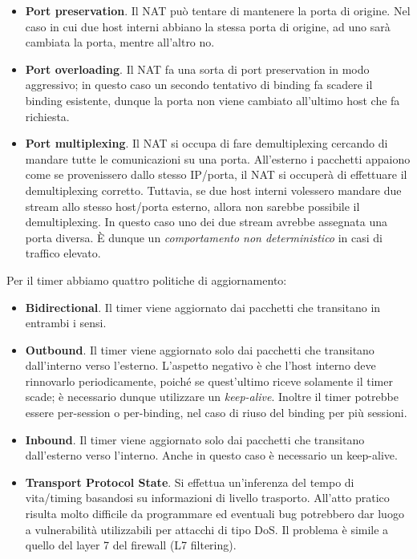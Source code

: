 \begin{itemize}
	\item \textbf{Port preservation}. Il NAT può tentare di mantenere la porta di origine. Nel caso in cui due host interni abbiano la stessa porta di origine, ad uno sarà cambiata la porta, mentre all'altro no.
	
	\item \textbf{Port overloading}. Il NAT fa una sorta di port preservation in modo aggressivo; in questo caso un secondo tentativo di binding fa scadere il binding esistente, dunque la porta non viene cambiato all'ultimo host che fa richiesta.
	
	\item \textbf{Port multiplexing}. Il NAT si occupa di fare demultiplexing cercando di mandare tutte le comunicazioni su una porta. All'esterno i pacchetti appaiono come se provenissero dallo stesso IP/porta, il NAT si occuperà di effettuare il demultiplexing corretto. Tuttavia, se due host interni volessero mandare due stream allo stesso host/porta esterno, allora non sarebbe possibile il demultiplexing. In questo caso uno dei due stream avrebbe assegnata una porta diversa. È dunque un \textit{comportamento non deterministico} in casi di traffico elevato.
\end{itemize}
Per il timer abbiamo quattro politiche di aggiornamento:
\begin{itemize}
	\item \textbf{Bidirectional}. Il timer viene aggiornato dai pacchetti che transitano in entrambi i sensi.
	\item \textbf{Outbound}. Il timer viene aggiornato solo dai pacchetti che transitano dall'interno verso l'esterno. L'aspetto negativo è che l'host interno deve rinnovarlo periodicamente, poiché se quest'ultimo riceve solamente il timer scade; è necessario dunque utilizzare un \textit{keep-alive}. Inoltre il timer potrebbe essere per-session o per-binding, nel caso di riuso del binding per più sessioni.
	\item \textbf{Inbound}. Il timer viene aggiornato solo dai pacchetti che transitano dall'esterno verso l'interno. Anche in questo caso è necessario un keep-alive.
	\item \textbf{Transport Protocol State}. Si effettua un'inferenza del tempo di vita/timing basandosi su informazioni di livello trasporto. All'atto pratico risulta molto difficile da programmare ed eventuali bug potrebbero dar luogo a vulnerabilità utilizzabili per attacchi di tipo DoS. Il problema è simile a quello del layer 7 del firewall (L7 filtering).
\end{itemize}
